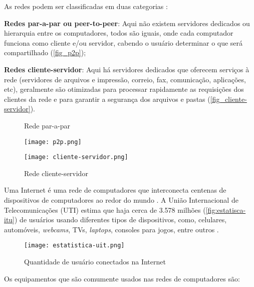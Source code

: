 As redes podem ser classificadas em duas categorias \cite{esr:arquitetura}: 
\begin{alineas}
\item \textbf{Redes par-a-par ou peer-to-peer}: Aqui não existem servidores dedicados ou hierarquia entre os computadores, todos são iguais, onde cada computador funciona como cliente e/ou servidor, cabendo o usuário determinar o que será compartilhado (\autoref{fig_p2p});
\item \textbf{Redes cliente-servidor}: Aqui há servidores dedicados que oferecem serviços à rede (servidores de arquivos e impressão, correio, fax, comunicação, aplicações, etc), geralmente são otimizadas para processar rapidamente as requisições dos clientes da rede e para garantir a segurança dos arquivos e pastas (\autoref{fig_cliente-servidor}). 
\end{alineas}

\begin{figure}[htb]
 \label{fig:arquitetura-redes}
 \centering
 \begin{minipage}{0.4\textwidth}
  \centering
  \caption{Rede par-a-par} \label{fig_p2p}
  \texttt{[image: p2p.png]}
 \end{minipage}
 \hfill
 \begin{minipage}{0.4\textwidth}
  \centering
  \caption{Rede cliente-servidor} \label{fig_cliente-servidor}
  \texttt{[image: cliente-servidor.png]}
 \end{minipage}
\end{figure}

Uma Internet é uma rede de computadores que interconecta centenas de dispositivos de computadores ao redor do mundo \cite{redes:kurose}. A União Internacional de Telecomunicações (UTI) estima que haja cerca de 3.578 milhões (\autoref{fig:estatisca-itu}) de usuários usando diferentes tipos de dispositivos, como, celulares, automóveis, \textit{webcams}, TVs, \textit{laptops}, consoles para jogos, entre outros \cite{estatistica:itu}.

\begin{figure}[htb]
    \centering
    \caption{Quantidade de usuário conectados na Internet} 
    \texttt{[image: estatistica-uit.png]}
    \label{fig:estatisca-itu}
\end{figure}

Os equipamentos que são comumente usados nas redes de computadores são:

